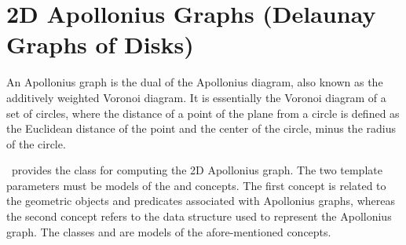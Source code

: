 
\chapter{2D Apollonius Graphs (Delaunay Graphs of Disks)}
\label{ref-chapter-apollonius2}


An Apollonius graph is the dual of the Apollonius diagram, also known
as the additively weighted Voronoi diagram. It is essentially the
Voronoi diagram of a set of circles, where the distance of a
point of the plane from a circle is defined as the Euclidean
distance of the point and the center of the circle, minus the radius
of the circle.

\cgal\ provides the class  for
computing the 2D Apollonius graph. The two template parameters must be
models of the  and
 concepts. The first concept is
related to the geometric objects and predicates associated with
Apollonius graphs, whereas the second concept refers to the data
structure used to represent the Apollonius graph. The classes
 and
 are models of the
afore-mentioned concepts.


 \\
 \\
 \\
 \\


\\
\\
\\
\\
\\

